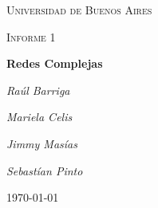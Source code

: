\documentclass[11pt, spanish]{article}
\begin{document}
\begin{titlepage}
    \centering
    {\scshape\LARGE Universidad de Buenos Aires \par}
    \vspace{1cm}
    {\scshape\Large Informe 1\par}
    \vspace{1.5cm}
    {\huge\bfseries Redes Complejas\par}
    \vspace{2cm}
    {\Large\itshape Ra\'ul Barriga\par}
    {\Large\itshape Mariela Celis\par}
    {\Large\itshape Jimmy Mas\'ias\par}
    {\Large\itshape Sebast\'ian Pinto\par}

    \vfill

    \vfill

    {\large \today\par}
\end{titlepage}

\tableofcontents

\newpage

\newpage

\newpage
    
\newpage
    


\end{document}
